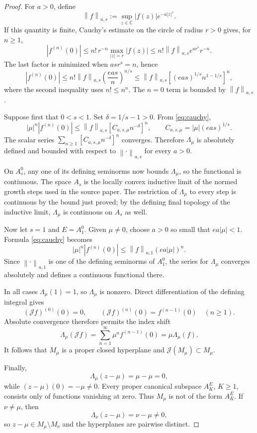 \documentclass[11pt]{article}
\newcommand{\C}{\mathbb C}
\newcommand{\J}{\mathcal J}
\newcommand{\Lam}{\Lambda}
\newcommand{\norm}[1]{\left\lVert #1\right\rVert}
\begin{document}
\begin{proof}
For $a>0$, define
\[
  \norm{f}_{a,s}:=\sup_{z\in\C}|f(z)|e^{-a|z|^s}.
\]
If this quantity is finite, Cauchy's estimate on the circle of radius $r>0$ gives, for $n\geq1$,
\[
  |f^{(n)}(0)|
  \leq n!\,r^{-n}\max_{|z|=r}|f(z)|
  \leq n!\norm{f}_{a,s}e^{ar^s}r^{-n}.
\]
The last factor is minimized when $asr^s=n$, hence
\begin{equation}\label{eq:cauchy}
  |f^{(n)}(0)|
  \leq n!\norm{f}_{a,s}\left(\frac{eas}{n}\right)^{n/s}
  \leq \norm{f}_{a,s}
  \left[(eas)^{1/s}n^{1-1/s}\right]^n,
\end{equation}
where the second inequality uses $n!\leq n^n$. The $n=0$ term is bounded by $\norm{f}_{a,s}$.

Suppose first that $0<s<1$. Set $\delta=1/s-1>0$. From \eqref{eq:cauchy},
\[
  |\mu|^n|f^{(n)}(0)|
  \leq \norm{f}_{a,s}\left[C_{a,s,\mu}n^{-\delta}\right]^n,
  \qquad C_{a,s,\mu}=|\mu|(eas)^{1/s}.
\]
The scalar series $\sum_{n\geq1}[C_{a,s,\mu}n^{-\delta}]^n$ converges. Therefore $\Lam_\mu$ is absolutely defined and bounded with respect to $\norm{\cdot}_{a,s}$ for every $a>0$.

On $A_s^0$, any one of its defining seminorms now bounds $\Lam_\mu$, so the functional is continuous. The space $A_s$ is the locally convex inductive limit of the normed growth steps used in the source paper. The restriction of $\Lam_\mu$ to every step is continuous by the bound just proved; by the defining final topology of the inductive limit, $\Lam_\mu$ is continuous on $A_s$ as well.

Now let $s=1$ and $E=A_1^0$. Given $\mu\ne0$, choose $a>0$ so small that $ea|\mu|<1$. Formula \eqref{eq:cauchy} becomes
\[
  |\mu|^n|f^{(n)}(0)|
  \leq \norm{f}_{a,1}(ea|\mu|)^n.
\]
Since $\norm{\cdot}_{a,1}$ is one of the defining seminorms of $A_1^0$, the series for $\Lam_\mu$ converges absolutely and defines a continuous functional there.

In all cases $\Lam_\mu(1)=1$, so $\Lam_\mu$ is nonzero. Direct differentiation of the defining integral gives
\[
  (\J f)^{(0)}(0)=0,
  \qquad
  (\J f)^{(n)}(0)=f^{(n-1)}(0)\quad(n\geq1).
\]
Absolute convergence therefore permits the index shift
\[
  \Lam_\mu(\J f)
  =\sum_{n=1}^\infty\mu^n f^{(n-1)}(0)
  =\mu\Lam_\mu(f).
\]
It follows that $M_\mu$ is a proper closed hyperplane and $\J(M_\mu)\subset M_\mu$.

Finally,
\[
  \Lam_\mu(z-\mu)=\mu-\mu=0,
\]
while $(z-\mu)(0)=-\mu\ne0$. Every proper canonical subspace $A_K^E$, $K\geq1$, consists only of functions vanishing at zero. Thus $M_\mu$ is not of the form $A_K^E$. If $\nu\ne\mu$, then
\[
  \Lam_\nu(z-\mu)=\nu-\mu\ne0,
\]
so $z-\mu\in M_\mu\setminus M_\nu$ and the hyperplanes are pairwise distinct.
\end{proof}
\end{document}
